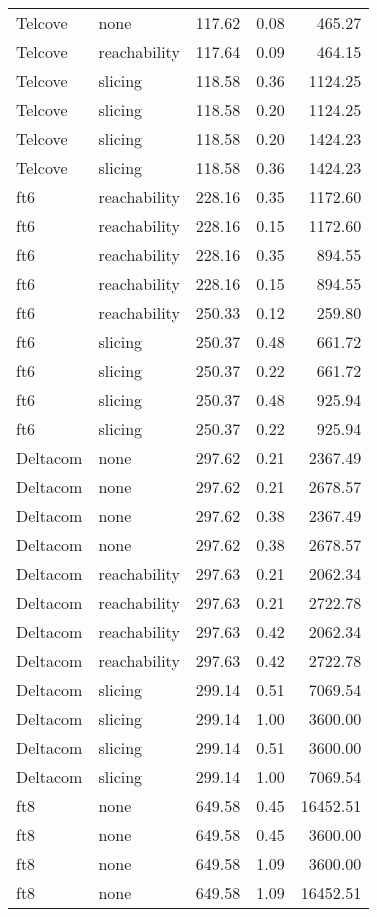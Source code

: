 \begin{tabular}{llrrr}
Telcove & none & 117.62 & 0.08 & 465.27 \\
Telcove & reachability & 117.64 & 0.09 & 464.15 \\
Telcove & slicing & 118.58 & 0.36 & 1124.25 \\
Telcove & slicing & 118.58 & 0.20 & 1124.25 \\
Telcove & slicing & 118.58 & 0.20 & 1424.23 \\
Telcove & slicing & 118.58 & 0.36 & 1424.23 \\
ft6 & reachability & 228.16 & 0.35 & 1172.60 \\
ft6 & reachability & 228.16 & 0.15 & 1172.60 \\
ft6 & reachability & 228.16 & 0.35 & 894.55 \\
ft6 & reachability & 228.16 & 0.15 & 894.55 \\
ft6 & reachability & 250.33 & 0.12 & 259.80 \\
ft6 & slicing & 250.37 & 0.48 & 661.72 \\
ft6 & slicing & 250.37 & 0.22 & 661.72 \\
ft6 & slicing & 250.37 & 0.48 & 925.94 \\
ft6 & slicing & 250.37 & 0.22 & 925.94 \\
Deltacom & none & 297.62 & 0.21 & 2367.49 \\
Deltacom & none & 297.62 & 0.21 & 2678.57 \\
Deltacom & none & 297.62 & 0.38 & 2367.49 \\
Deltacom & none & 297.62 & 0.38 & 2678.57 \\
Deltacom & reachability & 297.63 & 0.21 & 2062.34 \\
Deltacom & reachability & 297.63 & 0.21 & 2722.78 \\
Deltacom & reachability & 297.63 & 0.42 & 2062.34 \\
Deltacom & reachability & 297.63 & 0.42 & 2722.78 \\
Deltacom & slicing & 299.14 & 0.51 & 7069.54 \\
Deltacom & slicing & 299.14 & 1.00 & 3600.00 \\
Deltacom & slicing & 299.14 & 0.51 & 3600.00 \\
Deltacom & slicing & 299.14 & 1.00 & 7069.54 \\
ft8 & none & 649.58 & 0.45 & 16452.51 \\
ft8 & none & 649.58 & 0.45 & 3600.00 \\
ft8 & none & 649.58 & 1.09 & 3600.00 \\
ft8 & none & 649.58 & 1.09 & 16452.51 \\

\end{tabular}
